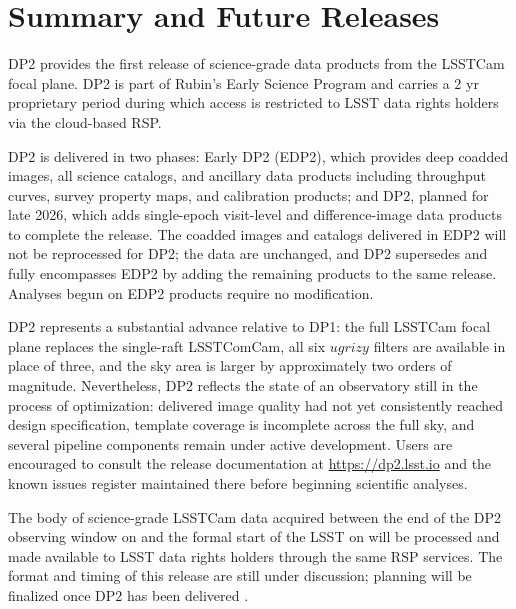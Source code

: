 \section{Summary and Future Releases}
\label{sec:summary}
%
\gls{DP2} provides the first release of science-grade data products from the  \gls{LSSTCam} focal plane.
\gls{DP2} is part of Rubin's Early Science Program \citep[][]{RTN-011} and carries a 2 yr proprietary period during which access is restricted to \gls{LSST} data rights holders via the cloud-based \gls{RSP}.

\gls{DP2} is delivered in two phases: Early \gls{DP2} (\gls{EDP2}), which provides deep coadded images, all science catalogs, and ancillary data products including throughput curves, survey property maps, and calibration products; and \gls{DP2}, planned for late 2026, which adds single-\gls{epoch} visit-level and difference-image data products to complete the release.
The coadded images and catalogs delivered in \gls{EDP2} will not be reprocessed for \gls{DP2}; the data are unchanged, and \gls{DP2} supersedes and fully encompasses \gls{EDP2} by adding the remaining products to the same release.
Analyses begun on \gls{EDP2} products require no modification.

\gls{DP2} represents a substantial advance relative to \gls{DP1}: the full \gls{LSSTCam} focal plane replaces the single-raft \gls{LSSTComCam}, all six $ugrizy$ filters are available in place of three, and the sky area is larger by approximately two orders of magnitude.
Nevertheless, \gls{DP2} reflects the state of an observatory still in the process of optimization: delivered image quality had not yet consistently reached design specification, template coverage is incomplete across the full sky, and several \gls{pipeline} components remain under active development.
Users are encouraged to consult the release documentation at \url{https://dp2.lsst.io} and the known issues register maintained there before beginning scientific analyses.

The body of science-grade \gls{LSSTCam} data acquired between the end of the \gls{DP2} observing window on \dptwoenddate and the formal start of the \gls{LSST} on \lsststartdate will be processed and made available to \gls{LSST} data rights holders through the same \gls{RSP} services.
The format and timing of this release are still under discussion; planning will be finalized once \gls{DP2} has been delivered \citep[][]{RTN-011}.

